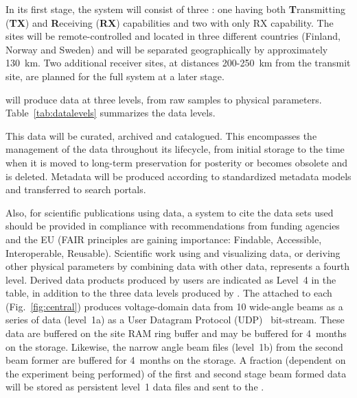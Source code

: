 \documentclass[12pt,a4paper]{article}
\begin{document}
In its first stage, the \ED system will consist of three \RSs:
one having both {\bf T}ransmitting ({\bf TX}) and {\bf R}eceiving ({\bf RX})
capabilities and two with only RX capability.  
The sites will
be remote-controlled and located in three different countries (Finland,
Norway and Sweden) and will be separated geographically by
approximately 130~km.  
Two additional receiver sites, at distances 200-250~km from the transmit site, 
are planned for the full \ED system at a later stage.

\iffalse
\ED will produce data at three levels, from raw samples to physical parameters. Table~\ref{tab:datalevels} summarizes the \ED data levels.

This data will be curated, archived and catalogued.
This encompasses the management of the data throughout
its lifecycle, from initial storage to the time when it is moved to
long-term preservation for posterity or becomes obsolete and is
deleted. Metadata will be produced according to standardized metadata models and transferred to search portals. 

Also, for scientific publications using \ED data, a system to cite the data sets used should be provided in compliance with recommendations from funding agencies and the EU (FAIR principles are gaining importance: Findable, Accessible, Interoperable, Reusable). %
Scientific work using and visualizing \ED data, or deriving other physical parameters by combining \ED data with other data, represents a fourth level. Derived data products produced by \ED users are indicated as Level~4 in the table, in addition to the three data levels produced by \ED.
The \fsru attached to each \SA (Fig.~\ref{fig:central}) produces voltage-domain data from 10 
wide-angle beams  
as a series of data (level~1a) as a {User Datagram Protocol} (UDP)~\cite{udp} bit-stream.
These data are buffered on the site RAM ring buffer and may be buffered for
4~months on the \OC storage.  
Likewise, the narrow angle beam files
(level~1b) from the second beam former are buffered for 4~months
on the \OC storage.  
A fraction (dependent on the experiment being
performed) of the first and second stage beam formed data will be
stored as persistent level~1 data files and sent to the \DCs.

\end{document}

